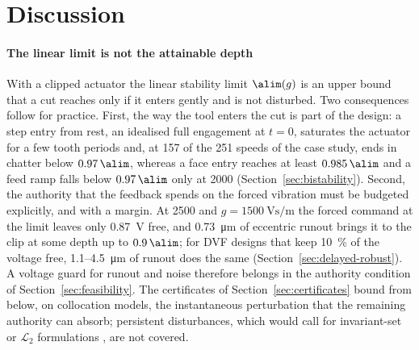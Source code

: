 \section{Discussion}\label{sec:discussion}

\paragraph{The linear limit is not the attainable depth}
With a clipped actuator the linear stability limit $\alim(g)$ is an upper bound that a cut reaches only if it enters gently and is not disturbed. Two consequences follow for practice. First, the way the tool enters the cut is part of the design: a step entry from rest, an idealised full engagement at $t=0$, saturates the actuator for a few tooth periods and, at 157 of the 251 speeds of the case study, ends in chatter below $0.97\,\alim$, whereas a face entry reaches at least $0.985\,\alim$ and a feed ramp falls below $0.97\,\alim$ only at \SI{2000}{\rpm} (Section~\ref{sec:bistability}). Second, the authority that the feedback spends on the forced vibration must be budgeted explicitly, and with a margin. At \SI{2500}{\rpm} and $g=\SI{1500}{\volt\second\per\metre}$ the forced command at the limit leaves only \SI{0.87}{\volt} free, and \SI{0.73}{\micro\metre} of eccentric runout brings it to the clip at some depth up to $0.9\,\alim$; for DVF designs that keep \SI{10}{\percent} of the voltage free, 1.1--\SI{4.5}{\micro\metre} of runout does the same (Section~\ref{sec:delayed-robust}). A voltage guard for runout and noise therefore belongs in the authority condition of Section~\ref{sec:feasibility}. The certificates of Section~\ref{sec:certificates} bound from below, on collocation models, the instantaneous perturbation that the remaining authority can absorb; persistent disturbances, which would call for invariant-set or $\mathcal L_2$ formulations \citep{hu2002disturbance,fang2004l2}, are not covered.

